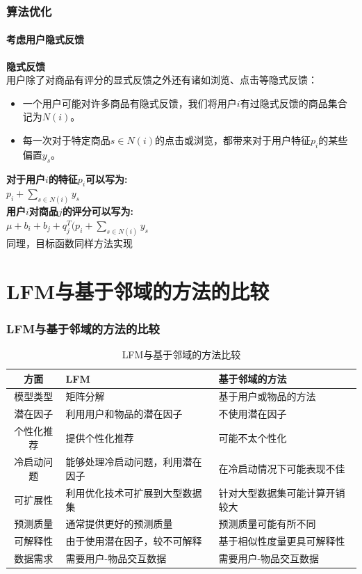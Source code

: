 \documentclass{beamer}
\begin{document}
	\begin{frame}
	\frametitle{算法优化}
	\framesubtitle{考虑用户隐式反馈}
		\textbf{隐式反馈}\\
		用户除了对商品有评分的显式反馈之外还有诸如浏览、点击等隐式反馈：
		\begin{minipage}[c][0.35\textheight][c]{\linewidth}
			\centering
			\begin{itemize}
  				\item 一个用户可能对许多商品有隐式反馈，我们将用户$i$有过隐式反馈的商品集合记为$N(i)$。
  				\item 每一次对于特定商品$s\in N(i)$的点击或浏览，都带来对于用户特征$p_i$的某些偏置$y_s$。 			
  			\end{itemize}
		\end{minipage}
		\begin{minipage}[c][0.15\textheight][c]{\linewidth}
			\centering
			\textbf{对于用户$i$的特征$p_i$可以写为:}\\
			$p_i+\sum_{s\in N(i)}y_s$\\
			\textbf{用户$i$对商品$j$的评分可以写为:}\\
			$\mu+b_i+b_j+q_j^T(p_i+\sum_{s\in N(i)}y_s$\\
			同理，目标函数同样方法实现
		\end{minipage}
	\end{frame}
	
\section{LFM与基于邻域的方法的比较}
	\begin{frame}
	\frametitle{LFM与基于邻域的方法的比较}
		\begin{table}
		\centering
			\begin{tabularx}{\textwidth}{|c|X|X|}	
			\hline
			\textbf{方面} & \textbf{LFM} & \textbf{基于邻域的方法} \\
			\hline
			模型类型 & 矩阵分解 & 基于用户或物品的方法 \\
			\hline
			潜在因子 & 利用用户和物品的潜在因子 & 不使用潜在因子 \\
			\hline
			个性化推荐 & 提供个性化推荐 & 可能不太个性化 \\
			\hline
			冷启动问题 & 能够处理冷启动问题，利用潜在因子 & 在冷启动情况下可能表现不佳 \\
			\hline
			可扩展性 & 利用优化技术可扩展到大型数据集 & 针对大型数据集可能计算开销较大 \\
			\hline
			预测质量 & 通常提供更好的预测质量 & 预测质量可能有所不同 \\
			\hline
			可解释性 & 由于使用潜在因子，较不可解释 & 基于相似性度量更具可解释性 \\
			\hline
			数据需求 & 需要用户-物品交互数据 & 需要用户-物品交互数据 \\
			\hline
			\end{tabularx}
			\caption{LFM与基于邻域的方法比较}
		\end{table}
	\end{frame}
\end{document}
